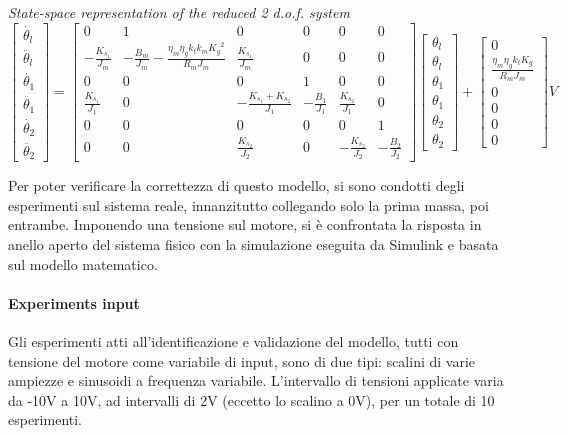 \textit{State-space representation of the reduced 2 d.o.f. system}
\begin{equation}
	\begin{bmatrix}
		\dot{\theta_l} \\
		\ddot{\theta_l} \\
		\dot{\theta_1} \\
		\ddot{\theta_1} \\
		\dot{\theta_2} \\
		\ddot{\theta_2}
	\end{bmatrix}
	=
	\begin{bmatrix}
		0 &1 & 0 & 0 & 0 & 0 \\
		-\frac{K_{s_1}}{J_m} & -\frac{B_m}{J_m}-\frac{\eta_m \eta_g k_t k_m {K_g}^2}{R_m J_m}  & \frac{K_{s_1}}{J_m} & 0 & 0 & 0 \\
		0 & 0 & 0 & 1 & 0 & 0 \\
		\frac{K_{s_1}}{J_1} & 0 & -\frac{K_{s_1}+K_{s_2}}{J_1} & -\frac{B_1}{J_1} & \frac{K_{s_2}}{J_1} & 0 \\
		0 & 0 & 0 & 0 & 0 & 1 \\
		0 & 0 & \frac{K_{s_2}}{J_2} & 0 & -\frac{K_{s_2}}{J_2} & -\frac{B_2}{J_2}
	\end{bmatrix}
	\begin{bmatrix}
		\theta_l \\
		\theta_l \\
		\theta_1 \\
		\theta_1 \\
		\theta_2 \\
		\theta_2
	\end{bmatrix}
	+
	\begin{bmatrix}
		0 \\
		\frac{\eta_m \eta_g k_t K_g}{R_m J_m} \\
		0 \\
		0 \\
		0 \\
		0
	\end{bmatrix}
	V
\end{equation}

Per poter verificare la correttezza di questo modello, si sono condotti degli esperimenti sul sistema reale, innanzitutto collegando solo la prima massa, poi entrambe.
Imponendo una tensione sul motore, si è confrontata la risposta in anello aperto del sistema fisico con la simulazione eseguita da Simulink e basata sul modello matematico.
\paragraph{Experiments input}
Gli esperimenti atti all'identificazione e validazione del modello, tutti con tensione del motore come variabile di input, sono di due tipi: scalini di varie ampiezze e sinusoidi a frequenza variabile. 
L'intervallo di tensioni applicate varia da -10V a 10V, ad intervalli di 2V (eccetto lo scalino a 0V), per un totale di 10 esperimenti.

